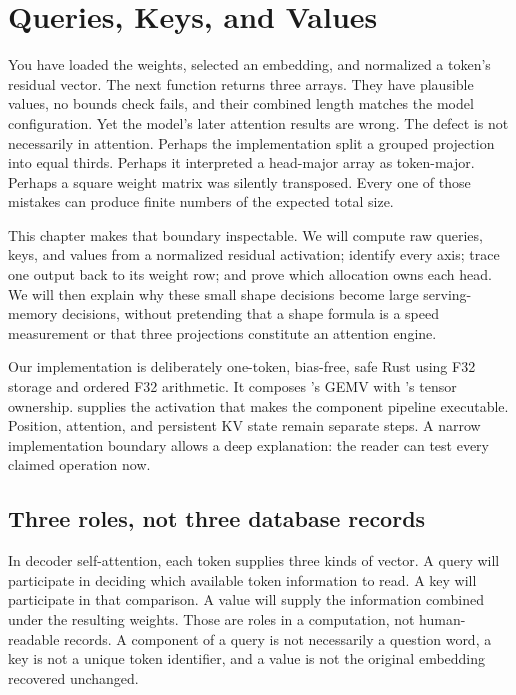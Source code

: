 \chapter{Queries, Keys, and Values}\label{chapter-8-queries-keys-and-values}\label{app:qkv}
You have loaded the weights, selected an embedding, and normalized a
token's residual vector. The next function returns three arrays. They
have plausible values, no bounds check fails, and their combined length
matches the model configuration. Yet the model's later attention results
are wrong. The defect is not necessarily in attention. Perhaps the
implementation split a grouped projection into equal thirds. Perhaps it
interpreted a head-major array as token-major. Perhaps a square weight
matrix was silently transposed. Every one of those mistakes can produce
finite numbers of the expected total size.

This chapter makes that boundary inspectable. We will compute raw
queries, keys, and values from a normalized residual activation;
identify every axis; trace one output back to its weight row; and prove
which allocation owns each head. We will then explain why these small
shape decisions become large serving-memory decisions, without
pretending that a shape formula is a speed measurement or that three
projections constitute an attention engine.

Our implementation is deliberately one-token, bias-free, safe Rust using
F32 storage and ordered F32 arithmetic. It composes 's GEMV
with 's tensor ownership.  supplies the activation
that makes the component pipeline executable. Position, attention, and
persistent KV state remain separate steps. A narrow implementation
boundary allows a deep explanation: the reader can test every claimed
operation now.

\section{Three roles, not three database
records}\label{three-roles-not-three-database-records}


In decoder self-attention, each token supplies three kinds of vector. A
query will participate in deciding which available token information to
read. A key will participate in that comparison. A value will supply the
information combined under the resulting weights. Those are roles in a
computation, not human-readable records. A component of a query is not
necessarily a question word, a key is not a unique token identifier, and
a value is not the original embedding recovered unchanged.


